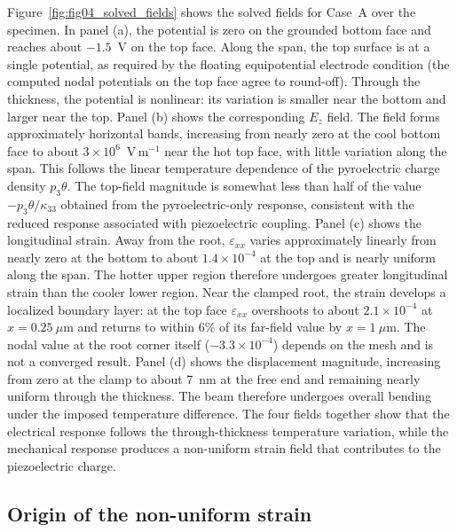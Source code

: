\documentclass[a4paper,12pt]{elsarticle}
\begin{document}
Figure~\ref{fig:fig04_solved_fields} shows the solved fields for Case~A over the
specimen. In panel (a), the potential is zero on the grounded bottom face and reaches
about $-1.5$~V on the top face. Along the span, the top surface is at a single potential, as required by the floating equipotential electrode condition (the computed nodal potentials on the top face agree to round-off). Through the thickness, the potential is
nonlinear: its variation is smaller near the bottom and larger near the top. Panel
(b) shows the corresponding $E_z$ field. The field forms approximately horizontal
bands, increasing from nearly zero at the cool bottom face to about
$3\times10^{6}$~V\,m$^{-1}$ near the hot top face, with little variation along the
span. This follows the linear temperature dependence of the pyroelectric charge
density $p_3\theta$. The top-field magnitude is somewhat less than half of the value
$-p_3\theta/\kappa_{33}$ obtained from the pyroelectric-only response, consistent with
the reduced response associated with piezoelectric coupling. Panel (c) shows the longitudinal
strain. Away from the root, $\varepsilon_{xx}$ varies approximately linearly from
nearly zero at the bottom to about $1.4\times10^{-4}$ at the top and is nearly uniform
along the span. The hotter upper region therefore undergoes greater longitudinal
strain than the cooler lower region. Near the clamped root, the strain develops a
localized boundary layer: at the top face $\varepsilon_{xx}$ overshoots to about $2.1\times10^{-4}$ at $x=0.25~\mu$m and returns to within 6\% of its far-field value by $x=1~\mu$m. The nodal value at the root corner itself ($-3.3\times10^{-4}$) depends on the mesh and is not a converged result. Panel (d) shows the displacement
magnitude, increasing from zero at the clamp to about 7~nm at the free end and
remaining nearly uniform through the thickness. The beam therefore undergoes overall
bending under the imposed temperature difference. The four fields together show that
the electrical response follows the through-thickness temperature variation, while
the mechanical response produces a non-uniform strain field that contributes to the
piezoelectric charge.

\subsection{Origin of the non-uniform strain}
\label{sec:clamp}
\end{document}
